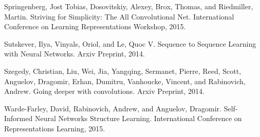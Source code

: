 \documentclass[12pt]{article}
\begin{document}
\begin{thebibliography}{99.}
Springenberg, Jost Tobias, Dosovitskiy, Alexey, Brox, Thomas, and Riedmiller,
Martin. Striving for Simplicity: The All Convolutional Net. International
Conference on Learning Representations Workshop, 2015.


Sutskever, Ilya, Vinyals, Oriol, and Le, Quoc V. Sequence to Sequence Learning with
Neural Networks. Arxiv Preprint, 2014.


Szegedy, Christian, Liu, Wei, Jia, Yangqing, Sermanet, Pierre, Reed, Scott,
Anguelov, Dragomir, Erhan, Dumitru, Vanhoucke, Vincent, and Rabinovich, Andrew.
Going deeper with convolutions. Arxiv Preprint, 2014.


Warde-Farley, David, Rabinovich, Andrew, and  Anguelov, Dragomir. Self-Informed
Neural Networks Structure Learning. International Conference on Representations
Learning, 2015.
\end{thebibliography}

\end{document}

